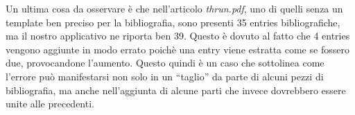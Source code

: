 Un ultima cosa da osservare è che nell'articolo \textit{thrun.pdf}, uno di quelli senza un template ben preciso per la bibliografia, sono presenti 35 entries bibliografiche, ma il nostro applicativo ne riporta ben 39. Questo è dovuto al fatto che 4 entries vengono aggiunte in modo errato poichè una entry viene estratta come se fossero due, provocandone l'aumento. Questo quindi è un caso che sottolinea come l'errore può manifestarsi non solo in un ``taglio'' da parte di alcuni pezzi di bibliografia, ma anche nell'aggiunta di alcune parti che invece dovrebbero essere unite alle precedenti.


